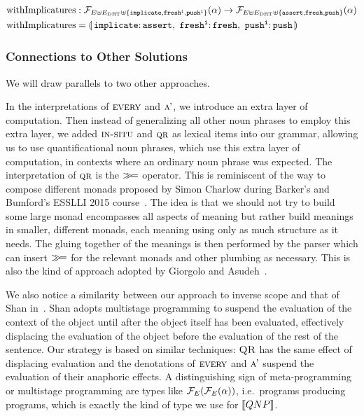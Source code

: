\begin{align*}
  \withImplicatures &: \FF_{E \uplus E_\DRT \uplus \{\op{implicate},\op{fresh^i},\op{push^i}\}}(\alpha) \to
                       \FF_{E \uplus E_\DRT \uplus \{\op{assert},\op{fresh},\op{push}\}}(\alpha) \\
  \withImplicatures &= \banana{\onto{\op{implicate}}{\op{assert}},\
                               \onto{\op{fresh^i}}{\op{fresh}},\
                               \onto{\op{push^i}}{\op{push}}}
\end{align*}


\subsubsection{Connections to Other Solutions}

We will draw parallels to two other approaches.

In the interpretations of $\textsc{every}$ and $\textsc{a'}$, we introduce an
extra layer of computation. Then instead of generalizing all other noun
phrases to employ this extra layer, we added $\textsc{in-situ}$ and $\textsc{qr}$
as lexical items into our grammar, allowing us to use quantificational noun
phrases, which use this extra layer of computation, in contexts where an
ordinary noun phrase was expected. The interpretation of $\textsc{qr}$ is the
$\mathbin{\gg\!=}$ operator. This is reminiscent of the way to compose different
monads proposed by Simon Charlow during Barker's and Bumford's ESSLLI 2015
course~\cite{barker2015monads}. The idea is that we should not try to build
some large monad encompasses all aspects of meaning but rather build
meanings in smaller, different monads, each meaning using only as much
structure as it needs. The gluing together of the meanings is then
performed by the parser which can insert $\mathbin{\gg\!=}$ for the relevant monads
and other plumbing as necessary. This is also the kind of approach adopted
by Giorgolo and Asudeh~\cite{giorgolo2015natural}.

We also notice a similarity between our approach to inverse scope and that
of Shan in~\cite{shan2007inverse}. Shan adopts multistage programming to
suspend the evaluation of the context of the object until after the object
itself has been evaluated, effectively displacing the evaluation of the
object before the evaluation of the rest of the sentence. Our strategy is
based on similar techniques: $\textsc{QR}$ has the same effect of displacing
evaluation and the denotations of $\textsc{every}$ and $\textsc{a'}$ suspend the
evaluation of their anaphoric effects. A distinguishing sign of
meta-programming or multistage programming are types like
$\mathcal{F}_E(\mathcal{F}_E(\alpha))$, i.e.\ programs producing programs, which is exactly
the kind of type we use for $\llbracket QNP \rrbracket$.


